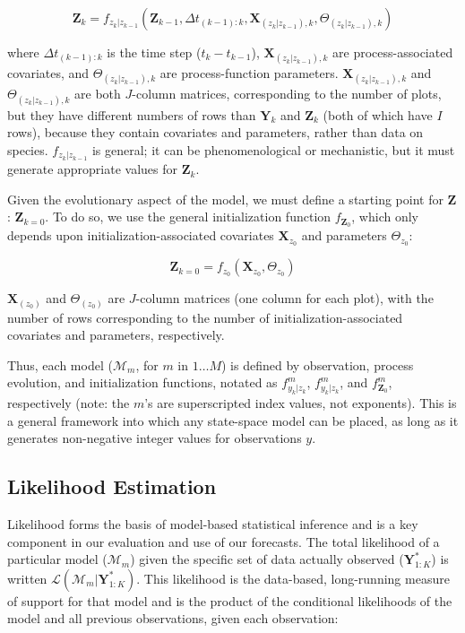 \documentclass{article}
\begin{document}
\begin{equation}
\label{eq:2}
\textbf{Z}_{k} = f_{z_k|z_{k-1}}(\textbf{Z}_{k-1}, \Delta t_{(k-1):k}, \textbf{X}_{(z_k|z_{k-1}), k},\Theta_{(z_k|z_{k-1}), k})
\end{equation}

where $\Delta t_{(k-1):k}$ is the time step ($t_k - t_{k-1}$), $\textbf{X}_{(z_k|z_{k-1}), k}$ are process-associated covariates, and $\Theta_{(z_k|z_{k-1}), k}$ are process-function parameters. $\textbf{X}_{(z_k|z_{k-1}), k}$ and $\Theta_{(z_k|z_{k-1}), k}$ are both $J$-column matrices, corresponding to  the number of plots, but they have different numbers of rows than $\textbf{Y}_k$ and $\textbf{Z}_k$ (both of which have $I$ rows), because they contain covariates and parameters, rather than data on species. $f_{z_k|z_{k-1}}$ is general; it can be phenomenological or mechanistic, but it must generate appropriate values for $\textbf{Z}_{k}$. 

Given the evolutionary aspect of the model, we must define a starting point for $\textbf{Z}$: $\textbf{Z}_{k=0}$. To do so, we use the general initialization function $f_{\textbf{Z}_0}$, which only depends upon initialization-associated covariates $\textbf{X}_{z_0}$ and parameters $\Theta_{z_0}$:

\begin{equation}
\label{eq:3}
\textbf{Z}_{k=0} = f_{z_0}(\textbf{X}_{z_0}, \Theta_{z_0})
\end{equation}

$\textbf{X}_{(z_0)}$ and $\Theta_{(z_0)}$ are $J$-column matrices (one column for each plot), with the number of rows corresponding to the number of initialization-associated covariates and parameters, respectively. 

Thus, each model ($\mathcal{M}_m$, for $m$ in $1 \ldots M$) is defined by observation, process evolution, and initialization functions, notated as $f^m_{y_k|z_k}$, $f^m_{y_k|z_k}$, and $f^m_{\textbf{Z}_0}$, respectively (note: the $m$'s are superscripted index values, not exponents). This is a general framework into which any state-space model can be placed, as long as it generates non-negative integer values for observations $y$. 

\subsection{Likelihood Estimation}
\label{subsec:devmods_le}

Likelihood forms the basis of model-based statistical inference \citep{Pawitan2001} and is a key component in our evaluation and use of our forecasts. The total likelihood of a particular model ($\mathcal{M}_m$) given the specific set of data actually observed ($\textbf{Y}^{*}_{1:K}$) is written $\mathcal{L}(\mathcal{M}_m|\textbf{Y}^{*}_{1:K})$. This likelihood is the data-based, long-running measure of support for that model and is the product of the conditional likelihoods of the model and all previous observations, given each observation:
\end{document}
